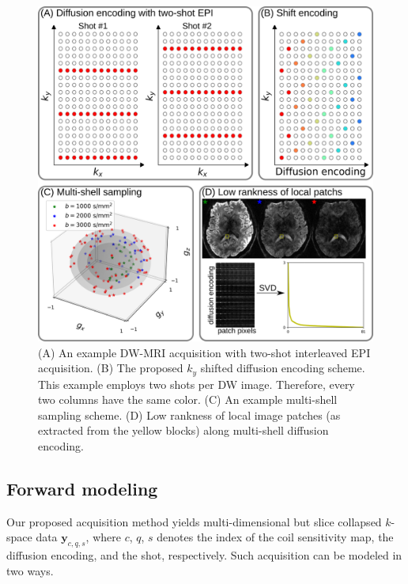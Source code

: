 \documentclass[preprint,12pt,authoryear,review]{elsarticle}
\begin{document}
	\begin{figure}
		\centering
		\includegraphics[width=\linewidth]{../figures/fig1.png}
		\caption{(A) An example DW-MRI acquisition
		with two-shot interleaved EPI acquisition.
		(B) The proposed $k_y$ shifted diffusion encoding scheme.
		This example employs two shots per DW image.
		Therefore, every two columns have the same color.
		(C) An example multi-shell sampling scheme.
		(D) Low rankness of local image patches (as extracted from the yellow blocks)
		along multi-shell diffusion encoding.}
		\label{FIG:sampling}
	\end{figure}

	\pagebreak

	\subsection{Forward modeling}
	Our proposed acquisition method yields multi-dimensional but
	slice collapsed $k$-space data $\mathbf{y}_{c,q,s}$,
	where $c$, $q$, $s$ denotes the index of the coil sensitivity map,
	the diffusion encoding, and the shot, respectively.
	Such acquisition can be modeled in two ways.
\end{document}
